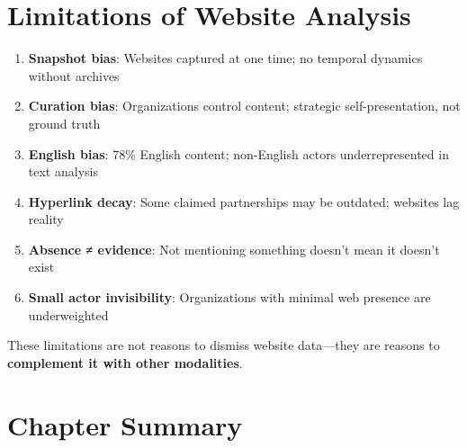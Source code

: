 \section*{Limitations of Website Analysis}

\begin{criticalbox}
\begin{enumerate}[leftmargin=*, itemsep=0.3em]
\item \textbf{Snapshot bias}: Websites captured at one time; no temporal dynamics without archives
\item \textbf{Curation bias}: Organizations control content; strategic self-presentation, not ground truth
\item \textbf{English bias}: 78\% English content; non-English actors underrepresented in text analysis
\item \textbf{Hyperlink decay}: Some claimed partnerships may be outdated; websites lag reality
\item \textbf{Absence ≠ evidence}: Not mentioning something doesn't mean it doesn't exist
\item \textbf{Small actor invisibility}: Organizations with minimal web presence are underweighted
\end{enumerate}
\end{criticalbox}

These limitations are not reasons to dismiss website data---they are reasons to \textbf{complement it with other modalities}.


\section*{Chapter Summary}


